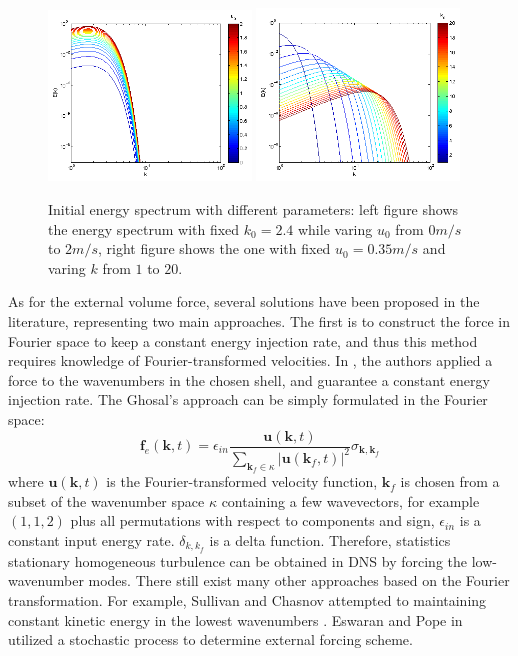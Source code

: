 \begin{figure}\centering
\includegraphics[width=0.48\textwidth]{Figures/eng_spr_u}
\includegraphics[width=0.48\textwidth]{Figures/eng_spr_k}
\caption{Initial energy spectrum with different parameters: left figure shows the energy spectrum with fixed $k_0 = 2.4$ while varing $u_0$ from $0m/s$ to $2m/s$, right figure shows the one with fixed $u_0 = 0.35m/s$ and varing $k$ from $1$ to $20$.\label{fig:eng_spr}}
\end{figure}

As for the external volume force, several solutions have been proposed in the literature, representing two main approaches. The first is to construct the force in Fourier space to keep a constant energy injection rate, and thus this method requires knowledge of Fourier-transformed velocities. In \cite{Ghosal1995Dynamic, Carati1995Representation}, the authors applied a force to the wavenumbers in the chosen shell, and guarantee a constant energy injection rate. The Ghosal's approach can be simply formulated in the Fourier space: 
\begin{equation}
\mathbf{f}_e(\mathbf{k},t) = \epsilon_{in}\frac{\mathbf{u}(\mathbf{k},t)}
{\sum_{\mathbf{k}_f\in \kappa}|\mathbf{u}(\mathbf{k}_f,t)|^2}
\sigma_{\mathbf{k},\mathbf{k}_f}
\end{equation}
where $\mathbf{u}(\mathbf{k},t)$ is the Fourier-transformed velocity function, $\mathbf{k}_f$ is chosen from a subset of the wavenumber space $\kappa$ containing a few wavevectors, for example $(1,1,2)$ plus all permutations with respect to components and sign, $\epsilon_{in}$ is a constant input energy rate. $\delta_{k,k_f}$ is a delta function. Therefore, statistics stationary homogeneous turbulence can be obtained in DNS by forcing the low-wavenumber modes. There still exist many other approaches based on the Fourier transformation. For example, Sullivan and Chasnov attempted to maintaining constant kinetic energy in the lowest wavenumbers \cite{Sullivan1994Deterministic, Chasnov1991Simulation}. Eswaran and Pope in \cite{Pope1988Examination} utilized a stochastic process to determine external forcing scheme. 

